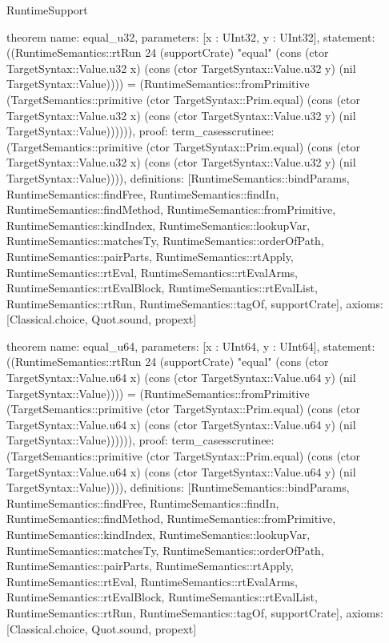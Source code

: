 \begin{lexlean}{RuntimeSupport}
\begin{semanticmodule}
theorem{
  name: equal_u32,
  parameters: [x : UInt32, y : UInt32],
  statement: ((RuntimeSemantics::rtRun 24 (supportCrate) "equal" (cons (ctor TargetSyntax::Value.u32 x) (cons (ctor TargetSyntax::Value.u32 y) (nil TargetSyntax::Value)))) = (RuntimeSemantics::fromPrimitive (TargetSemantics::primitive (ctor TargetSyntax::Prim.equal) (cons (ctor TargetSyntax::Value.u32 x) (cons (ctor TargetSyntax::Value.u32 y) (nil TargetSyntax::Value)))))),
  proof: term_cases{scrutinee: (TargetSemantics::primitive (ctor TargetSyntax::Prim.equal) (cons (ctor TargetSyntax::Value.u32 x) (cons (ctor TargetSyntax::Value.u32 y) (nil TargetSyntax::Value)))), definitions: [RuntimeSemantics::bindParams, RuntimeSemantics::findFree, RuntimeSemantics::findIn, RuntimeSemantics::findMethod, RuntimeSemantics::fromPrimitive, RuntimeSemantics::kindIndex, RuntimeSemantics::lookupVar, RuntimeSemantics::matchesTy, RuntimeSemantics::orderOfPath, RuntimeSemantics::pairParts, RuntimeSemantics::rtApply, RuntimeSemantics::rtEval, RuntimeSemantics::rtEvalArms, RuntimeSemantics::rtEvalBlock, RuntimeSemantics::rtEvalList, RuntimeSemantics::rtRun, RuntimeSemantics::tagOf, supportCrate]},
  axioms: [Classical.choice, Quot.sound, propext]
}

theorem{
  name: equal_u64,
  parameters: [x : UInt64, y : UInt64],
  statement: ((RuntimeSemantics::rtRun 24 (supportCrate) "equal" (cons (ctor TargetSyntax::Value.u64 x) (cons (ctor TargetSyntax::Value.u64 y) (nil TargetSyntax::Value)))) = (RuntimeSemantics::fromPrimitive (TargetSemantics::primitive (ctor TargetSyntax::Prim.equal) (cons (ctor TargetSyntax::Value.u64 x) (cons (ctor TargetSyntax::Value.u64 y) (nil TargetSyntax::Value)))))),
  proof: term_cases{scrutinee: (TargetSemantics::primitive (ctor TargetSyntax::Prim.equal) (cons (ctor TargetSyntax::Value.u64 x) (cons (ctor TargetSyntax::Value.u64 y) (nil TargetSyntax::Value)))), definitions: [RuntimeSemantics::bindParams, RuntimeSemantics::findFree, RuntimeSemantics::findIn, RuntimeSemantics::findMethod, RuntimeSemantics::fromPrimitive, RuntimeSemantics::kindIndex, RuntimeSemantics::lookupVar, RuntimeSemantics::matchesTy, RuntimeSemantics::orderOfPath, RuntimeSemantics::pairParts, RuntimeSemantics::rtApply, RuntimeSemantics::rtEval, RuntimeSemantics::rtEvalArms, RuntimeSemantics::rtEvalBlock, RuntimeSemantics::rtEvalList, RuntimeSemantics::rtRun, RuntimeSemantics::tagOf, supportCrate]},
  axioms: [Classical.choice, Quot.sound, propext]
}


\end{semanticmodule}
\end{lexlean}
